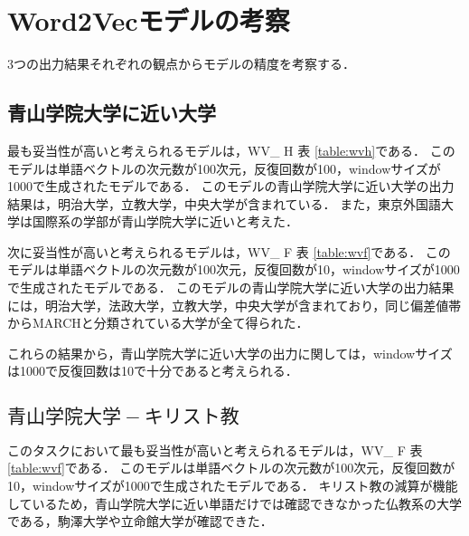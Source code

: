 \section{Word2Vecモデルの考察}
3つの出力結果それぞれの観点からモデルの精度を考察する．

\subsection{青山学院大学に近い大学}
最も妥当性が高いと考えられるモデルは，WV\_ H 表 \ref{table:wvh}である．
このモデルは単語ベクトルの次元数が100次元，反復回数が100，windowサイズが1000で生成されたモデルである．
このモデルの青山学院大学に近い大学の出力結果は，明治大学，立教大学，中央大学が含まれている．
また，東京外国語大学は国際系の学部が青山学院大学に近いと考えた．

次に妥当性が高いと考えられるモデルは，WV\_ F 表 \ref{table:wvf}である．
このモデルは単語ベクトルの次元数が100次元，反復回数が10，windowサイズが1000で生成されたモデルである．
このモデルの青山学院大学に近い大学の出力結果には，明治大学，法政大学，立教大学，中央大学が含まれており，同じ偏差値帯からMARCHと分類されている大学が全て得られた．




これらの結果から，青山学院大学に近い大学の出力に関しては，windowサイズは1000で反復回数は10で十分であると考えられる．

\subsection{$ 青山学院大学 - キリスト教 $}
このタスクにおいて最も妥当性が高いと考えられるモデルは，WV\_ F 表 \ref{table:wvf}である．
このモデルは単語ベクトルの次元数が100次元，反復回数が10，windowサイズが1000で生成されたモデルである．
キリスト教の減算が機能しているため，青山学院大学に近い単語だけでは確認できなかった仏教系の大学である，駒澤大学や立命館大学が確認できた．


